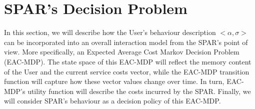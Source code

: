 \documentclass{msdm2012}
\begin{document}


\section{SPAR's Decision Problem}\label{spar_model}
In this section, we will describe how the User's behaviour description
$<\alpha,\sigma>$ can be incorporated into an overall interaction
model from the SPAR's point of view. More specifically, an Expected
Average Cost Markov Decision Problem (EAC-MDP). The state space of
this EAC-MDP will reflect the memory content of the User and the
current service costs vector, while the EAC-MDP transition function
will capture how these vector values change over time. In turn,
EAC-MDP's utility function will describe the costs incurred by the
SPAR. Finally, we will consider SPAR's behaviour as a decision policy
of this EAC-MDP.
\end{document}
